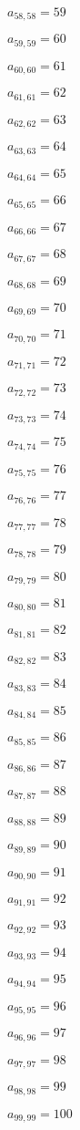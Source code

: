 \documentclass[a4paper,12pt]{article}
\begin{document}
$a _{ 58, 58 } = 59$

$a _{ 59, 59 } = 60$

$a _{ 60, 60 } = 61$

$a _{ 61, 61 } = 62$

$a _{ 62, 62 } = 63$

$a _{ 63, 63 } = 64$

$a _{ 64, 64 } = 65$

$a _{ 65, 65 } = 66$

$a _{ 66, 66 } = 67$

$a _{ 67, 67 } = 68$

$a _{ 68, 68 } = 69$

$a _{ 69, 69 } = 70$

$a _{ 70, 70 } = 71$

$a _{ 71, 71 } = 72$

$a _{ 72, 72 } = 73$

$a _{ 73, 73 } = 74$

$a _{ 74, 74 } = 75$

$a _{ 75, 75 } = 76$

$a _{ 76, 76 } = 77$

$a _{ 77, 77 } = 78$

$a _{ 78, 78 } = 79$

$a _{ 79, 79 } = 80$

$a _{ 80, 80 } = 81$

$a _{ 81, 81 } = 82$

$a _{ 82, 82 } = 83$

$a _{ 83, 83 } = 84$

$a _{ 84, 84 } = 85$

$a _{ 85, 85 } = 86$

$a _{ 86, 86 } = 87$

$a _{ 87, 87 } = 88$

$a _{ 88, 88 } = 89$

$a _{ 89, 89 } = 90$

$a _{ 90, 90 } = 91$

$a _{ 91, 91 } = 92$

$a _{ 92, 92 } = 93$

$a _{ 93, 93 } = 94$

$a _{ 94, 94 } = 95$

$a _{ 95, 95 } = 96$

$a _{ 96, 96 } = 97$

$a _{ 97, 97 } = 98$

$a _{ 98, 98 } = 99$

$a _{ 99, 99 } = 100$
\end{document}
